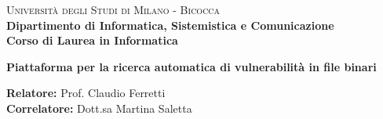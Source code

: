 

    
\begin{titlepage}
    
    \noindent
    \begin{minipage}[t]{0.19\textwidth}
    \end{minipage}
    \hspace{2mm}
    \begin{minipage}[t]{0.70\textwidth}
    {
            {\textsc{Università degli Studi di Milano - Bicocca}} \\
            \textbf{Dipartimento di Informatica, Sistemistica e Comunicazione} \\
            \textbf{Corso di Laurea in Informatica} \\
            \par
    }
    \end{minipage}
    
\vspace{40mm}
    
\begin{center}
        {\LARGE{
                \textbf{ Piattaforma per la ricerca automatica di vulnerabilità in file binari } }
                \par
        }
    \end{center}
    
    \vspace{50mm}

    \noindent
    {\large \textbf{Relatore:} Prof. Claudio Ferretti } \\

    \noindent
    {\large \textbf{Correlatore:} Dott.sa Martina Saletta }
    
    \vspace{15mm}


\end{titlepage}
